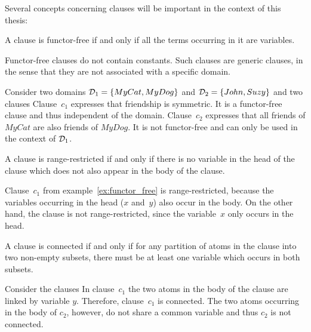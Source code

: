 Several concepts concerning clauses will be important in the context of this thesis:
\begin{definition}
\label{def:funtor_free}
A clause is functor-free if and only if all the terms occurring in it are variables.
\end{definition}
Functor-free clauses do not contain constants. Such clauses are generic clauses, in the sense that they are not associated with a specific domain.
\begin{example}
\label{ex:functor_free}
Consider two domains $\mathcal{D}_1 = \{MyCat, MyDog\}$ and $\mathcal{D}_2 = \{John, Suzy\}$ and two clauses 
Clause~$c_1$ expresses that friendship is symmetric. It is a functor-free clause and thus independent of the domain. Clause~$c_2$ expresses that all friends of $MyCat$ are also friends of $MyDog$. It is not functor-free and can only be used in the context of $\mathcal{D}_1$. 
\end{example}

\begin{definition}
\label{def:range_restricted}
A clause is range-restricted if and only if there is no variable in the head of the clause which does not also appear in the body of the clause.
\end{definition}

\begin{example}
Clause~$c_1$ from example~\ref{ex:functor_free} is range-restricted, because the variables occurring in the head ($x$ and~$y$) also occur in the body. On the other hand, the clause  is not range-restricted, since the variable~$x$ only occurs in the head.
\end{example}

\begin{definition}
\label{def:connected}
A clause is connected if and only if for any partition of atoms in the clause into two non-empty subsets, there must be at least one variable which occurs in both subsets.
\end{definition}

\begin{example}
Consider the clauses  In clause~$c_1$ the two atoms in the body of the clause are linked by variable $y$. Therefore, clause~$c_1$ is connected. The two atoms occurring in the body of $c_2$, however, do not share a common variable and thus $c_2$ is not connected.
\end{example}

